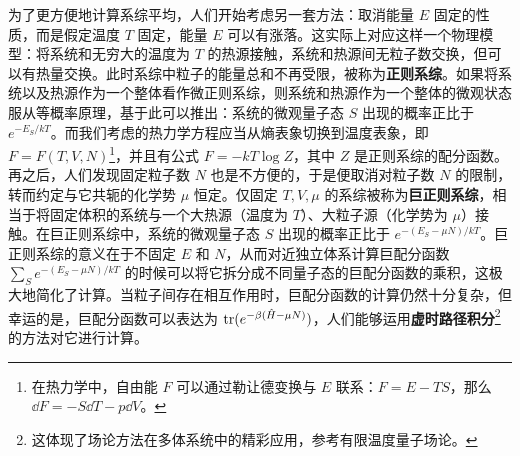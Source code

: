为了更方便地计算系综平均，人们开始考虑另一套方法：取消能量 $E$ 固定的性质，而是假定温度 $T$ 固定，能量 $E$ 可以有涨落。这实际上对应这样一个物理模型：将系统和无穷大的温度为 $T$ 的热源接触，系统和热源间无粒子数交换，但可以有热量交换。此时系综中粒子的能量总和不再受限，被称为\textbf{正则系综}。如果将系统以及热源作为一个整体看作微正则系综，则系统和热源作为一个整体的微观状态服从等概率原理，基于此可以推出：系统的微观量子态 $S$ 出现的概率正比于 $e^{-E_S/kT}$。而我们考虑的热力学方程应当从熵表象切换到温度表象，即 $F=F(T,V,N)$\footnote{在热力学中，自由能 $F$ 可以通过勒让德变换与 $E$ 联系：$F=E-TS$，那么 $\dd F=-S\dd T-p\dd V$。}，并且有公式 $F=-kT\log Z$，其中 $Z$ 是正则系综的配分函数。再之后，人们发现固定粒子数 $N$ 也是不方便的，于是便取消对粒子数 $N$ 的限制，转而约定与它共轭的化学势 $\mu$ 恒定。仅固定 $T,V,\mu$ 的系综被称为\textbf{巨正则系综}，相当于将固定体积的系统与一个大热源（温度为 $T$）、大粒子源（化学势为 $\mu$）接触。在巨正则系综中，系统的微观量子态 $S$ 出现的概率正比于 $e^{-(E_S-\mu N)/kT}$。巨正则系综的意义在于不固定 $E$ 和 $N$，从而对近独立体系计算巨配分函数 $\sum_S e^{-(E_S-\mu N)/kT}$ 的时候可以将它拆分成不同量子态的巨配分函数的乘积，这极大地简化了计算。当粒子间存在相互作用时，巨配分函数的计算仍然十分复杂，但幸运的是，巨配分函数可以表达为 ${\rm tr} (e^{-\beta(\hat H-\mu N)})$，人们能够运用\textbf{虚时路径积分}\footnote{这体现了场论方法在多体系统中的精彩应用，参考有限温度量子场论。}的方法对它进行计算。